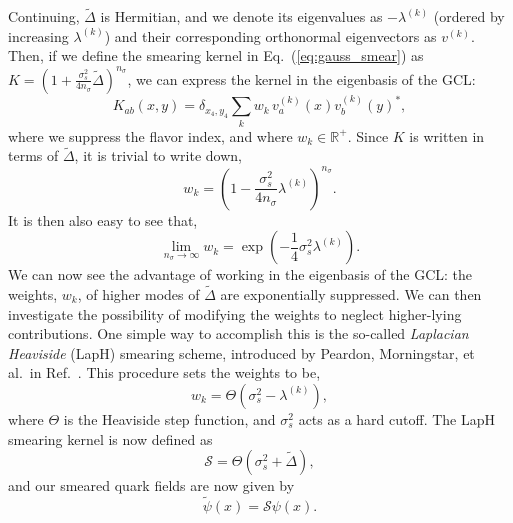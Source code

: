     Continuing, $\widetilde\Delta$ is Hermitian, and we denote its eigenvalues as $-\lambda^{(k)}$ (ordered by increasing $\lambda^{(k)}$) and their corresponding orthonormal eigenvectors as $v^{(k)}$. Then, if we define the smearing kernel in Eq.~(\ref{eq:gauss_smear}) as $K=\left(1+\frac{\sigma_{s}^{2}}{4 n_{\sigma}} \widetilde{\Delta}\right)^{n_{\sigma}}$, we can express the kernel in the eigenbasis of the GCL:
    \begin{equation}
        K_{a b}(x, y)=\delta_{x_{4}, y_{4}} \sum_{k} w_{k}\,v_{a}^{(k)}(x) v_{b}^{(k)}(y)^{*},
    \end{equation}
    where we suppress the flavor index, and where $w_k\in\mathbb{R}^+$. Since $K$ is written in terms of $\widetilde\Delta$, it is trivial to write down,
    \begin{equation}
        w_{k}=\left(1-\frac{\sigma_{s}^{2}}{4 n_{\sigma}} \lambda^{(k)}\right)^{n_{\sigma}}.
    \end{equation}
    It is then also easy to see that,
    \begin{equation}
        \lim _{n_{\sigma} \rightarrow \infty} w_{k}=\exp \left(-\frac{1}{4} \sigma_{s}^{2} \lambda^{(k)}\right).
    \end{equation}
    We can now see the advantage of working in the eigenbasis of the GCL: the weights, $w_{k}$, of higher modes of $\widetilde\Delta$ are exponentially suppressed. We can then investigate the possibility of modifying the weights to neglect higher-lying contributions. One simple way to accomplish this is the so-called \emph{Laplacian Heaviside} (LapH) smearing scheme, introduced by Peardon, Morningstar, et al.\ in Ref.~\cite{Peardon:2009gh}. This procedure sets the weights to be,
    \begin{equation}
        w_{k}=\Theta\left(\sigma_{s}^{2}-\lambda^{(k)}\right),
    \end{equation}
    where $\Theta$ is the Heaviside step function, and $\sigma_s^2$ acts as a hard cutoff. The LapH smearing kernel is now defined as
    \begin{equation}\label{eq:smearing_operator}
        \mathcal{S}=\Theta\left(\sigma_{s}^{2}+\widetilde{\Delta}\right),
    \end{equation}
    and our smeared quark fields are now given by
    \begin{equation}
        \widetilde\psi(x) = \mathcal{S}\psi(x).
    \end{equation}

